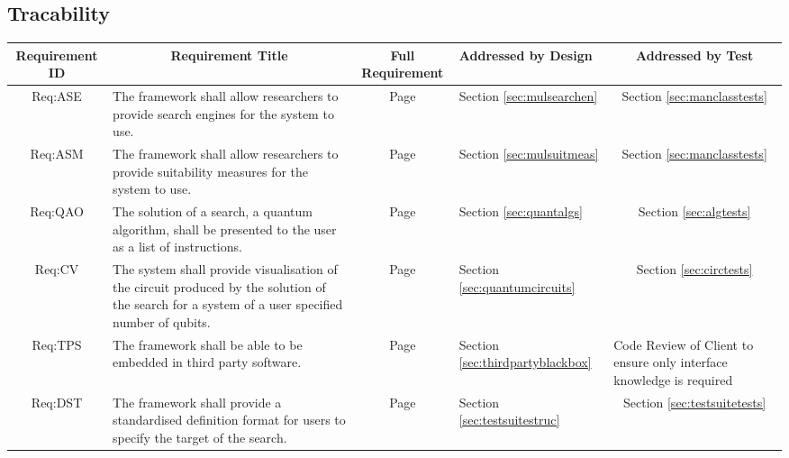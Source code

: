 \clearpage
\begin{landscape}
\section{Tracability}
\label{sec:tracability}

\centering
\noindent\begin{longtable}{|c|m{10cm}|c|m{4cm}|m{4cm}|}
\hline
\textbf{Requirement ID} &
\multicolumn{1}{c|}{\textbf{Requirement Title}} &
\textbf{Full Requirement} &
\textbf{Addressed by Design} &
\multicolumn{1}{c|}{\textbf{Addressed by Test}} \\ \hline

Req:ASE &
The framework shall allow researchers to provide search engines for the system to use. &
Page \pageref{sec:reqase} &
Section \ref{sec:mulsearchen} &
\multicolumn{1}{c|}{Section \ref{sec:manclasstests}}\\ \hline

Req:ASM &
The framework shall allow researchers to provide suitability measures for the system to use. &
Page \pageref{sec:reqasm} &
Section \ref{sec:mulsuitmeas} &
\multicolumn{1}{c|}{Section \ref{sec:manclasstests}}\\ \hline

Req:QAO &
The solution of a search, a quantum algorithm, shall be presented to the user as a list of instructions. &
Page \pageref{sec:reqqao} &
Section \ref{sec:quantalgs} &
\multicolumn{1}{c|}{Section \ref{sec:algtests}} \\ \hline

Req:CV &
The system shall provide visualisation of the circuit produced by the solution of the search for a system of a user specified number of qubits. &
Page \pageref{sec:reqcv} &
Section \ref{sec:quantumcircuits} &
\multicolumn{1}{c|}{Section \ref{sec:circtests}} \\ \hline

Req:TPS &
The framework shall be able to be embedded in third party software. &
Page \pageref{sec:reqtps} &
Section \ref{sec:thirdpartyblackbox} &
Code Review of Client to ensure only interface knowledge is required\\ \hline

Req:DST &
The framework shall provide a standardised definition format for users to specify the target of the search. &
Page \pageref{sec:reqdst} &
Section \ref{sec:testsuitestruc} &
\multicolumn{1}{c|}{Section \ref{sec:testsuitetests}} \\ \hline


\end{longtable}
\end{landscape}
